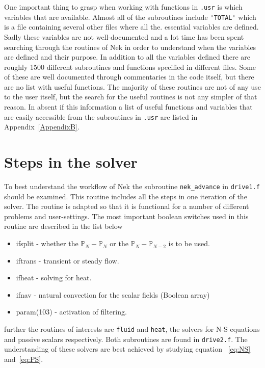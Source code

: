 One important thing to grasp when working with functions in \verb|.usr| is which variables that are available. 
Almost all of the subroutines include \verb|'TOTAL'| which is a file containing several other files where all the.
essential variables are defined. Sadly these variables are not well-documented and a lot time has been spent 
searching through the routines of Nek in order to understand when the variables are defined and their purpose. 
In addition to all the variables defined there are roughly 1500 different subroutines and functions specified in 
different files. Some of these are well documented through commentaries in the code itself, but there are no 
list with useful functions. The majority of these routines are not of any use to the user itself, but the search for the useful 
routines is not any simpler of that reason. In absent if this information a list of useful functions and variables that are easily 
accessible from the subroutines in \verb|.usr| are listed in Appendix~\ref{AppendixB}.
\section{Steps in the solver}
To best understand the workflow of Nek the subroutine \verb|nek_advance| in \verb|drive1.f| should be examined.
This routine includes all the steps in one iteration of the solver. The routine is adapted so that it is functional
for a number of different problems and user-settings. The most important boolean switches used in this routine are 
described in the list below 
%
\begin{itemize}
    \item ifsplit - whether the $\mathbb{P}_N-\mathbb{P}_N$ or the $\mathbb{P}_N-\mathbb{P}_{N-2}$ is to be used.
    \item iftrans - transient or steady flow.
    \item ifheat - solving for heat.
    \item ifnav - natural convection for the scalar fields (Boolean array)
    \item param(103) - activation of filtering.
\end{itemize}
%
further the routines of interests are \verb|fluid| and \verb|heat|, the solvers for N-S equations and passive scalars respectively.
Both subroutines are found in \verb|drive2.f|. The understanding of these solvers are best achieved by studying equation ~\ref{eq:NS} 
and~\ref{eq:PS}.  


